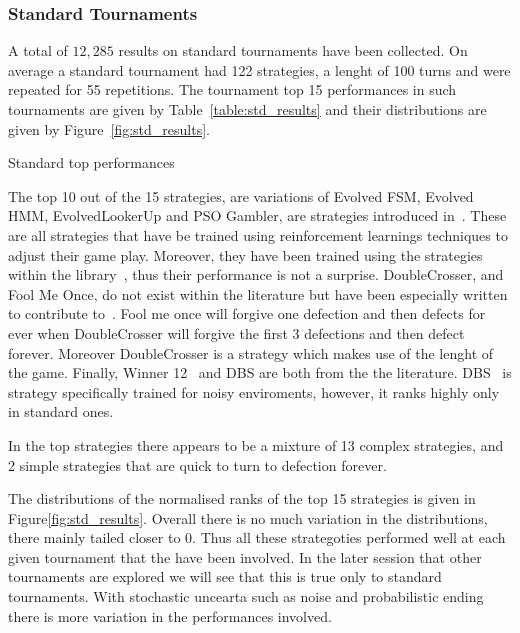 \documentclass{article}
\begin{document}
\subsubsection{Standard Tournaments}

A total of $12,285$ results on standard tournaments have been collected. On
average a standard tournament had 122 strategies, a lenght of 100 turns and
were repeated for 55 repetitions. The tournament top 15 performances in such
tournaments are given
by Table~\ref{table:std_results} and their distributions are given by
Figure~\ref{fig:std_results}.

\begin{table}
    \resizebox{.4\textwidth}{!}{
    }
    \caption{Standard top performances}\label{table:std_results}
\end{table}
The top 10 out of the 15 strategies, are variations of Evolved FSM, Evolved HMM,
EvolvedLookerUp and PSO Gambler, are strategies introduced in~\cite{Harper2017}.
These are all strategies that have be trained using reinforcement learnings
techniques to adjust their game play. Moreover, they have been trained using the
strategies within the library~\cite{axelrodproject}, thus their performance is
not a surprise. DoubleCrosser, and Fool Me Once, do not exist within the
literature but have been especially written to contribute
to~\cite{axelrodproject}. Fool me once will forgive one defection and then
defects for ever when DoubleCrosser will forgive the first 3 defections and then
defect forever. Moreover DoubleCrosser is a strategy which makes use of the
lenght of the game. Finally, Winner 12~\cite{Mathieu2017} and DBS are both from
the the literature. DBS~\cite{Au2006} is strategy specifically trained for noisy
enviroments, however, it ranks highly only in standard ones.

In the top strategies there appears to be a mixture of 13 complex strategies, and
2 simple strategies that are quick to turn to defection forever.

The distributions of the normalised ranks of the top 15 strategies is
given in Figure\ref{fig:std_results}. Overall there is no much variation in the
distributions, there mainly tailed closer to 0. Thus all these strategoties
performed well at each given tournament that the have been involved.
In the later session that other tournaments are explored we will see that
this is true only to standard tournaments. With stochastic uncearta
such as noise and probabilistic ending there is more variation in the 
performances involved.
\end{document}
